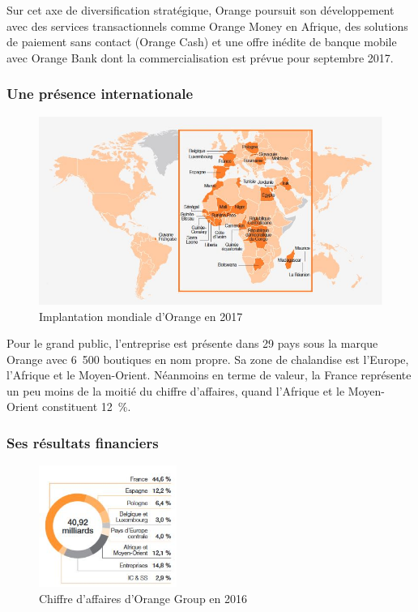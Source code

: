             Sur cet axe de diversification stratégique, Orange poursuit son développement avec des services transactionnels comme Orange Money en Afrique, des solutions de paiement sans contact (Orange Cash) et une offre inédite de banque mobile avec Orange Bank dont la commercialisation est prévue pour septembre 2017.

        \subsubsection{Une présence internationale}

        \begin{figure}[!ht]
            \center
            \includegraphics[width=1\textwidth]{./images/implem-mondiale-orange.jpg}
            \caption{Implantation mondiale d'Orange en 2017}
        \end{figure}

        Pour le grand public, l’entreprise est présente dans 29 pays sous la marque Orange avec 6 500 boutiques en nom propre.
        Sa zone de chalandise est l’Europe, l’Afrique et le Moyen-Orient.
        Néanmoins en terme de valeur, la France représente un peu moins de la moitié du chiffre d’affaires, quand l’Afrique et le Moyen-Orient constituent 12 \%.

        \subsubsection{Ses résultats financiers}

        \begin{figure}[!ht]
            \center
            \includegraphics[width=0.4\textwidth]{./images/ca-orange.jpg}
            \caption{Chiffre d'affaires d'Orange Group en 2016}
        \end{figure}

